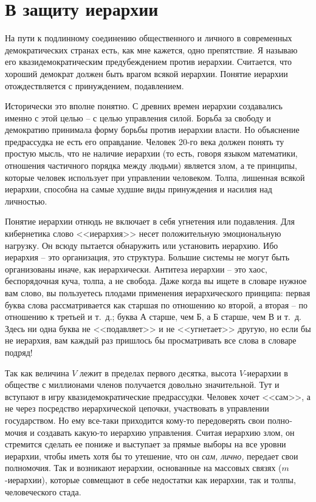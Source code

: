\documentclass{book}
\begin{document}
\section{В защиту иерархии}

На пути к подлинному соединению общественного и личного в современных демократических странах есть, как мне кажется, одно препятствие. Я называю его квазидемократическим преду­беждением против иерархии. Считается, что хороший демократ должен быть врагом всякой иерархии. Понятие иерархии отож­дествляется с принуждением, подавлением.

Исторически это вполне понятно. С древних времен иерар­хии создавались именно с этой целью -- с целью управления си­лой. Борьба за свободу и демократию принимала форму борьбы против иерархии власти. Но объяснение предрассудка не есть его оправдание. Человек 20-го века должен понять ту простую мысль, что не наличие иерархии (то есть, говоря языком математики, отношения частичного порядка между людьми) является злом, а те принципы, которые человек использует при управлении че­ловеком. Толпа, лишенная всякой иерархии, способна на самые худшие виды принуждения и насилия над личностью.

Понятие иерархии отнюдь не включает в себя угнетения или по­давления. Для кибернетика слово <<иерархия>> несет положитель­ную эмоциональную нагрузку. Он всюду пытается обнаружить или установить иерархию. Ибо иерархия -- это организация, это структура. Большие системы не могут быть организованы иначе, как иерархически. Антитеза иерархии -- это хаос, беспорядочная куча, толпа, а не свобода. Даже когда вы ищете в словаре нужное вам слово, вы пользуетесь плодами применения иерархического принципа: первая буква слова рассматривается как старшая по отношению ко второй, а вторая -- по отношению к третьей и т.~д.; буква А старше, чем Б, а Б старше, чем В и т.~д. Здесь ни одна буква не <<подавляет>> и не <<угнетает>> другую, но если бы не ие­рархия, вам каждый раз пришлось бы просматривать все слова в словаре подряд!

Так как величина $V$ лежит в пределах первого десятка, высо­та $V$-иерархии в обществе с миллионами членов получается до­вольно значительной. Тут и вступают в игру квазидемократические предрассудки. Человек хочет <<сам>>, а не через посредство иерархической цепочки, участвовать в управлении государством. Но ему все-таки приходится кому-то передоверять свои полно­мочия и создавать какую-то иерархию управления. Считая иерар­хию злом, он стремится сделать ее пониже и выступает за пря­мые выборы на все уровни иерархии, чтобы иметь хотя бы то утешение, что он \textit{сам, лично,}  передает свои полномочия. Так и возникают иерархии, основанные на массовых связях ($m$-иерархии), которые совмещают в себе недостатки как иерархии, так и толпы, человеческого стада.
\end{document}
